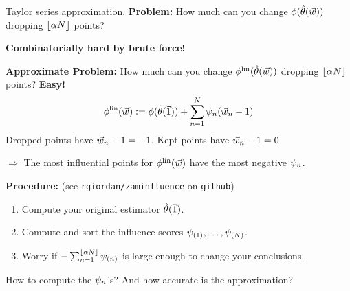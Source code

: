 \begin{frame}{Taylor series approximation.}
%
\textbf{Problem: }
%
How much can you change $\phi(\hat{\theta}(\vec{w}))$
dropping $\lfloor \alpha N \rfloor$ points?

\textbf{Combinatorially hard by brute force!}

\hrulefill

\textbf{Approximate Problem: }
%
How much can you change $\phi^{\mathrm{lin}}(\hat{\theta}(\vec{w}))$
dropping $\lfloor \alpha N \rfloor$ points?
%
\textbf{Easy! }
%
\begin{align*}
    \phi^{\mathrm{lin}}(\vec{w})
		:=  \phi(\hat{\theta}(\vec{1})) +
        \sum_{n=1}^N \psi_n (\vec{w}_n -1)
\end{align*}
%
Dropped points have $\vec{w}_n - 1 = -1$.  Kept points have $\vec{w}_n - 1 = 0$

$\Rightarrow$ The most influential points for $\phi^{\mathrm{lin}}(\vec{w})$ have the
most negative $\psi_n$.

\hrulefill

\textbf{Procedure:}  (see \texttt{rgiordan/zaminfluence} on \texttt{github})
\begin{enumerate}
    \item Compute your original estimator $\hat{\theta}(\vec{1})$.
    \item Compute and sort the influence scores
        $\psi_{(1)}, \ldots, \psi_{(N)}$.
    \item Worry if $- \sum_{n=1}^{\lfloor \alpha N \rfloor} \psi_{(n)}$ is large
    enough to change your conclusions.
\end{enumerate}

How to compute the $\psi_n$'s?  And how accurate is the approximation?

\end{frame}


